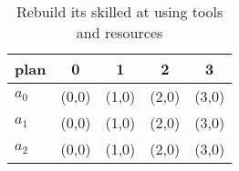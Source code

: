 \documentclass[a4paper]{article}
\begin{document}
\begin{table}
\begin{adjustbox}{width=0.6\columnwidth}
\begin{tabular}{|l|l|l|l|l|}
\hline
\textbf{plan} & \multicolumn{1}{c|}{\textbf{0}} & \multicolumn{1}{c|}{\textbf{1}} & \multicolumn{1}{c|}{\textbf{2}} & \multicolumn{1}{c|}{\textbf{3}} \\ \hline
\textbf{$a_0$}  & (0,0) & (1,0) & (2,0) & (3,0) \\ \hline
\textbf{$a_1$}  & (0,0) & (1,0) & (2,0) & (3,0) \\ \hline
\textbf{$a_2$}  & (0,0) & (1,0) & (2,0) & (3,0) \\ \hline
\end{tabular}
\end{adjustbox}
\caption{Rebuild its skilled at using tools and resources 
}
\end{table}
\end{document}
